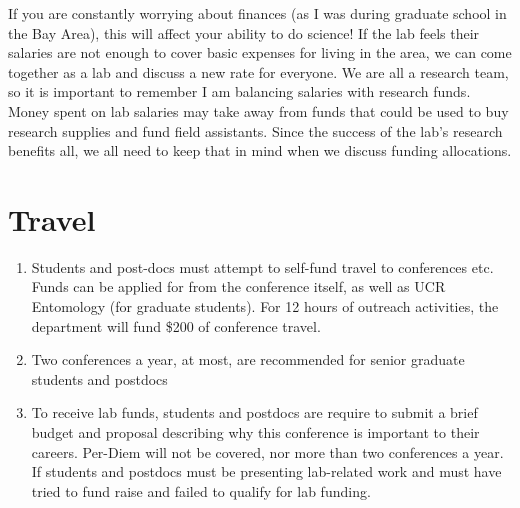 \documentclass[12pt]{article}
\begin{document}
If you are constantly worrying about finances (as I was during
graduate school in the Bay Area), this will affect your ability to do
science! If the lab feels their salaries are not enough to cover basic
expenses for living in the area, we can come together as a lab and
discuss a new rate for everyone. We are all a research team, so it is
important to remember I am balancing salaries with research
funds. Money spent on lab salaries may take away from funds that could
be used to buy research supplies and fund field assistants. Since the
success of the lab's research benefits all, we all need to keep that
in mind when we discuss funding allocations.

\section{Travel}
\begin{enumerate}
\item Students and post-docs must attempt to self-fund travel to
  conferences etc. Funds can be applied for from the conference
  itself, as well as UCR Entomology (for graduate students). For 12
  hours of outreach activities, the department will fund \$200 of
  conference travel. 
\item Two conferences a year, at most, are recommended
  for senior graduate students and postdocs
\item To receive lab funds, students and postdocs are require to
  submit a brief budget and proposal describing why this conference is
  important to their careers. Per-Diem will not be covered, nor more
  than two conferences a year. If students and postdocs must be
  presenting lab-related work and must have tried to fund raise and
  failed to qualify for lab funding.
\end{enumerate}
\end{document}
